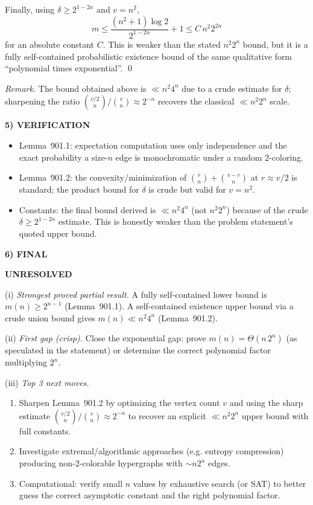 Finally, using $\delta\ge 2^{1-2n}$ and $v=n^2$,
\[
 m \le \frac{(n^2+1)\log 2}{2^{1-2n}} +1
 \le C\, n^2 2^{2n}
\]
for an absolute constant $C$.
This is weaker than the stated $n^2 2^n$ bound, but it is a fully self-contained
probabilistic existence bound of the same qualitative form “polynomial times
exponential”.
\qed

\emph{Remark.} The bound obtained above is $\ll n^2 4^n$ due to a crude estimate
for $\delta$; sharpening the ratio
$\binom{v/2}{n}/\binom{v}{n}\approx 2^{-n}$ recovers the classical $\ll n^2 2^n$
scale.

\medskip
\noindent\textbf{5) VERIFICATION}

\begin{itemize}
\item Lemma~901.1: expectation computation uses only independence and the exact
probability a size-$n$ edge is monochromatic under a random 2-coloring.
\item Lemma~901.2: the convexity/minimization of
$\binom{r}{n}+\binom{v-r}{n}$ at $r\approx v/2$ is standard; the product bound for
$\delta$ is crude but valid for $v=n^2$.
\item Constants: the final bound derived is $\ll n^2 4^n$ (not $n^2 2^n$) because
of the crude $\delta\ge 2^{1-2n}$ estimate. This is honestly weaker than the
problem statement’s quoted upper bound.
\end{itemize}

\medskip
\noindent\textbf{6) FINAL}

\textbf{UNRESOLVED}

(i) \emph{Strongest proved partial result.}
A fully self-contained lower bound is $m(n)\ge 2^{n-1}$ (Lemma~901.1).
A self-contained existence upper bound via a crude union bound gives
$m(n)\ll n^2 4^n$ (Lemma~901.2).

(ii) \emph{First gap (crisp).}
Close the exponential gap: prove $m(n)=\Theta(n\,2^n)$ (as speculated in the
statement) or determine the correct polynomial factor multiplying $2^n$.

(iii) \emph{Top 3 next moves.}
\begin{enumerate}
\item Sharpen Lemma~901.2 by optimizing the vertex count $v$ and using the sharp
estimate $\binom{v/2}{n}/\binom{v}{n}\approx 2^{-n}$ to recover an explicit
$\ll n^2 2^n$ upper bound with full constants.
\item Investigate extremal/algorithmic approaches (e.g. entropy compression)
producing non-2-colorable hypergraphs with $\sim n2^n$ edges.
\item Computational: verify small $n$ values by exhaustive search (or SAT) to
better guess the correct asymptotic constant and the right polynomial factor.
\end{enumerate}

